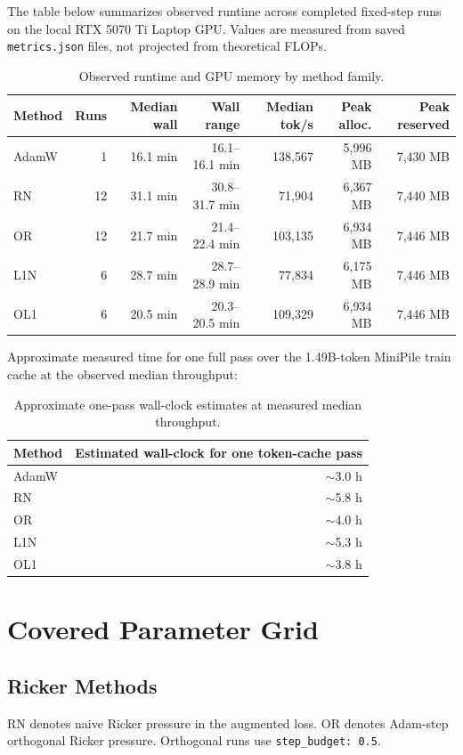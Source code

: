 \documentclass[10pt]{article}
\newcommand{\code}[1]{\texttt{#1}}
\newcommand{\tightsection}[1]{\section{#1}\vspace{-0.35em}}
\begin{document}
The table below summarizes observed runtime across completed fixed-step runs on the local RTX 5070 Ti Laptop GPU. Values are measured from saved \code{metrics.json} files, not projected from theoretical FLOPs.

\begin{table}[H]
\centering
\caption{Observed runtime and GPU memory by method family.}
\scriptsize
\begin{tabular}{lrrrrrr}
\toprule
Method & Runs & Median wall & Wall range & Median tok/s & Peak alloc. & Peak reserved \\
\midrule
AdamW & 1 & 16.1 min & 16.1--16.1 min & 138,567 & 5,996 MB & 7,430 MB \\
RN & 12 & 31.1 min & 30.8--31.7 min & 71,904 & 6,367 MB & 7,440 MB \\
OR & 12 & 21.7 min & 21.4--22.4 min & 103,135 & 6,934 MB & 7,446 MB \\
L1N & 6 & 28.7 min & 28.7--28.9 min & 77,834 & 6,175 MB & 7,446 MB \\
OL1 & 6 & 20.5 min & 20.3--20.5 min & 109,329 & 6,934 MB & 7,446 MB \\
\bottomrule
\end{tabular}
\end{table}

Approximate measured time for one full pass over the 1.49B-token MiniPile train cache at the observed median throughput:

\begin{table}[H]
\centering
\caption{Approximate one-pass wall-clock estimates at measured median throughput.}
\begin{tabular}{lr}
\toprule
Method & Estimated wall-clock for one token-cache pass \\
\midrule
AdamW & $\sim$3.0 h \\
RN & $\sim$5.8 h \\
OR & $\sim$4.0 h \\
L1N & $\sim$5.3 h \\
OL1 & $\sim$3.8 h \\
\bottomrule
\end{tabular}
\end{table}

\tightsection{Covered Parameter Grid}

\subsection*{Ricker Methods}

RN denotes naive Ricker pressure in the augmented loss. OR denotes Adam-step orthogonal Ricker pressure. Orthogonal runs use \code{step\_budget: 0.5}.
\end{document}
